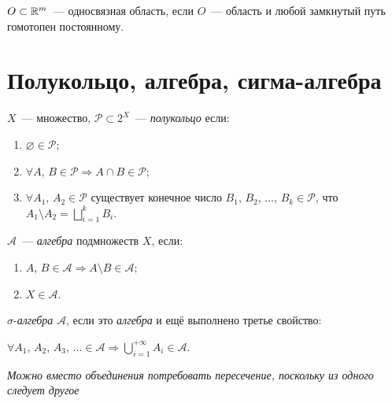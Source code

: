 \documentclass{article}
\begin{document}
        $O \subset \mathbb{R}^m$~--- односвязная область, если $O$~--- область и любой замкнутый путь гомотопен постоянному.
        
    \newpage
    
    \section{Полукольцо, алгебра, сигма-алгебра}
    
        $X$~--- множество, $\mathcal{P} \subset 2^X$~--- \textit{полукольцо} если:
        
        \begin{enumerate}
        
            \item $\varnothing \in \mathcal{P}$;
            
            \item $\forall A$, $B \in \mathcal{P} \Rightarrow A \cap B \in \mathcal{P}$;
            
            \item $\forall A_1$, $A_2 \in \mathcal{P}$ существует конечное число $B_1$, $B_2$, $\ldots$, $B_k \in \mathcal{P}$, что $A_1 \setminus A_2 =  \bigsqcup\limits^k_{i = 1} B_i$.
            
        \end{enumerate}
    
        $\mathcal{A}$~--- \textit{алгебра} подмножеств $X$, если:
        
        \begin{enumerate}
        
            \item $A$, $B \in \mathcal{A} \Rightarrow A \setminus B \in \mathcal{A}$;
            
            \item $X \in \mathcal{A}$.
            
        \end{enumerate}
        
        $\sigma$-\textit{алгебра} $\mathcal{A}$, если это \textit{алгебра} и ещё выполнено третье свойство:
        
            $\forall A_1$, $A_2$, $A_3$, $\ldots \in \mathcal{A} \Rightarrow \bigcup\limits_{i = 1}^{+\infty} A_i \in \mathcal{A}$.
            
        \textit{Можно вместо объединения потребовать пересечение, поскольку из одного следует другое}
        
    \newpage
    
\end{document}
